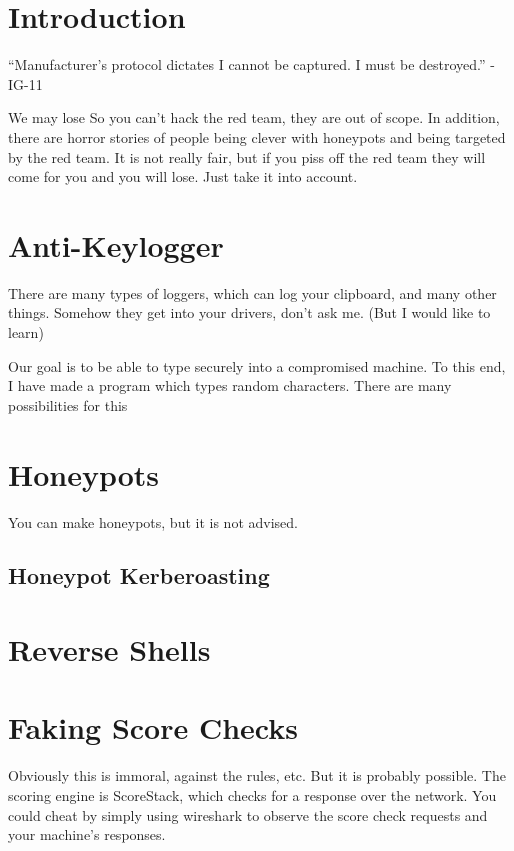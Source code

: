 \documentclass{article}
\begin{document}
\graphicspath{ {./Images/} }
\tableofcontents

\section{Introduction}
“Manufacturer's protocol dictates I cannot be captured. I must be destroyed.” - IG-11

We may lose
So you can't hack the red team, they are out of scope.
In addition, there are horror stories of people being clever with honeypots and being targeted by the red team.
It is not really fair, but if you piss off the red team they will come for you and you will lose. Just take it into account.





\section{Anti-Keylogger}
There are many types of loggers, which can log your clipboard, and many other things. Somehow they get into your drivers, don't ask me. (But I would like to learn)

Our goal is to be able to type securely into a compromised machine. To this end, I have made a program which types random characters. There are many possibilities for this

\section{Honeypots}
You can make honeypots, but it is not advised.

\subsection{Honeypot Kerberoasting}

\section{Reverse Shells}

\section{Faking Score Checks}
Obviously this is immoral, against the rules, etc. But it is probably possible. The scoring engine is ScoreStack, which checks for a response over the network.
You could cheat by simply using wireshark to observe the score check requests and your machine's responses.
\end{document}
